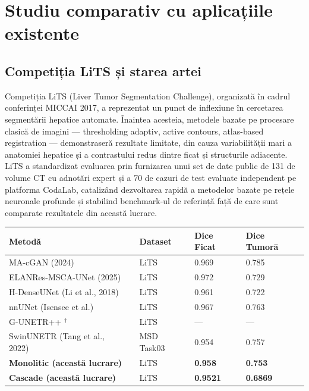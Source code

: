 \documentclass[12pt, a4paper]{report}
\begin{document}
\section{Studiu comparativ cu aplicațiile existente}



\subsection{Competiția LiTS și starea artei}

Competiția LiTS (Liver Tumor Segmentation Challenge), organizată
în cadrul conferinței MICCAI 2017, a reprezentat un punct de
inflexiune în cercetarea segmentării hepatice automate. Înaintea
acesteia, metodele bazate pe procesare clasică de imagini —
thresholding adaptiv, active contours, atlas-based registration
— demonstraseră rezultate limitate, din cauza variabilității mari
a anatomiei hepatice și a contrastului redus dintre ficat și
structurile adiacente. LiTS a standardizat evaluarea prin
furnizarea unui set de date public de 131 de volume CT cu adnotări
expert și a 70 de cazuri de test evaluate independent pe platforma
CodaLab, catalizând dezvoltarea rapidă a metodelor bazate pe
rețele neuronale profunde și stabilind benchmark-ul de referință
față de care sunt comparate rezultatele din această lucrare.


\begin{center}
\renewcommand{\arraystretch}{1.4}
\begin{tabular}{p{4.0cm} p{2.5cm} p{2.8cm} p{2.8cm}}
    \toprule
    \textbf{Metodă} & \textbf{Dataset} &
    \textbf{Dice Ficat} & \textbf{Dice Tumoră} \\
    \midrule
    MA-cGAN \newline (2024)~\cite{macgan2024}
        & LiTS & 0.969 & 0.785 \\
    \addlinespace
    ELANRes-MSCA-UNet \newline (2025)~\cite{elanres2025}
        & LiTS & 0.972 & 0.729 \\
    \addlinespace
    H-DenseUNet \newline (Li et al., 2018)~\cite{li2018hdenseunet}
        & LiTS & 0.961 & 0.722 \\
    \addlinespace
    nnUNet \newline (Isensee et al.)~\cite{isensee2019automated}
        & LiTS & 0.967 & 0.763 \\
    \addlinespace
    G-UNETR++ $^{\dagger}$~\cite{gunetrpp}
        & LiTS & — & — \\
    \addlinespace
    SwinUNETR \newline (Tang et al., 2022)~\cite{tang2022swinunetr}
        & MSD Task03 & 0.954 & 0.757 \\
    \addlinespace
    \textbf{Monolitic (această lucrare)}
        & LiTS & \textbf{0.958} & \textbf{0.753} \\
    \addlinespace
\textbf{Cascade (această lucrare)}
        & LiTS & \textbf{0.9521 } & \textbf{0.6869 } \\
    \bottomrule
\end{tabular}
\end{center}
\end{document}
